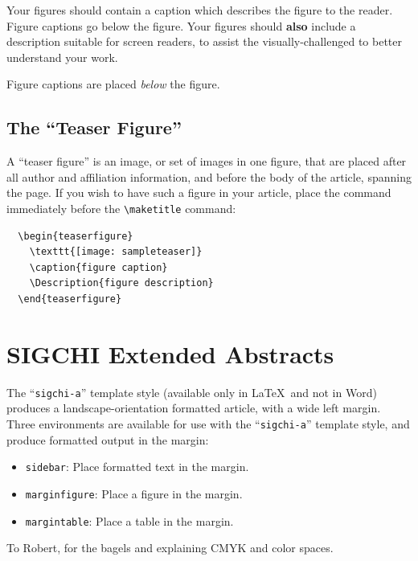 \documentclass[sigchi]{acmart}
\begin{document}
Your figures should contain a caption which describes the figure to
the reader. Figure captions go below the figure. Your figures should
{\bfseries also} include a description suitable for screen readers, to
assist the visually-challenged to better understand your work.

Figure captions are placed {\itshape below} the figure.

\subsection{The ``Teaser Figure''}

A ``teaser figure'' is an image, or set of images in one figure, that
are placed after all author and affiliation information, and before
the body of the article, spanning the page. If you wish to have such a
figure in your article, place the command immediately before the
\verb|\maketitle| command:
\begin{verbatim}
  \begin{teaserfigure}
    \texttt{[image: sampleteaser]}
    \caption{figure caption}
    \Description{figure description}
  \end{teaserfigure}
\end{verbatim}




\section{SIGCHI Extended Abstracts}

The ``\verb|sigchi-a|'' template style (available only in \LaTeX\ and
not in Word) produces a landscape-orientation formatted article, with
a wide left margin. Three environments are available for use with the
``\verb|sigchi-a|'' template style, and produce formatted output in
the margin:
\begin{itemize}
\item {\verb|sidebar|}:  Place formatted text in the margin.
\item {\verb|marginfigure|}: Place a figure in the margin.
\item {\verb|margintable|}: Place a table in the margin.
\end{itemize}

\begin{acks}
To Robert, for the bagels and explaining CMYK and color spaces.
\end{acks}
\end{document}
